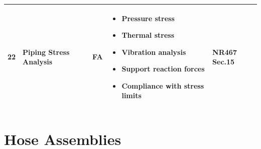\documentclass[11pt,a4paper]{report}
\newcommand{\fa}{\textbf{\textcolor{warningred}{FA}}}
\begin{document}
\begin{longtable}{|p{0.5cm}|p{5cm}|p{1.5cm}|p{5.5cm}|p{2cm}|}
22 & Piping Stress Analysis & \fa{} & 
\begin{itemize}[leftmargin=*,nosep]
\item Pressure stress
\item Thermal stress
\item Vibration analysis
\item Support reaction forces
\item Compliance with stress limits
\end{itemize} & NR467 Sec.15 \\
\hline

\end{longtable}

\section{Hose Assemblies}
\end{document}
